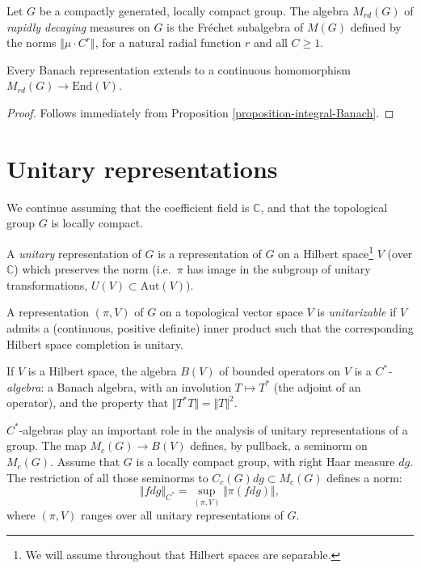 \begin{definition}
\label{definition-rapidly-decaying}
 Let $G$ be a compactly generated, locally compact group. The algebra $M_{rd}(G)$ of {\it rapidly decaying} measures on $G$ is the Fr\'echet subalgebra of $M(G)$ defined by the norms $\Vert \mu \cdot C^r\Vert$, for a natural radial function $r$ and all $C \ge 1$. 
\end{definition}

\begin{proposition}
\label{proposition-rapiddecay-Banach}
Every Banach representation extends to a continuous homomorphism $M_{rd}(G)\to \text{End}(V)$. 
\end{proposition}

\begin{proof}
 Follows immediately from Proposition \ref{proposition-integral-Banach}.
\end{proof}

\section{Unitary representations}
\label{section-unitary-representations}

We continue assuming that the coefficient field is $\mathbb C$, and that the topological group $G$ is locally compact.


\begin{definition}
\label{definition-unitary-representation}
A {\it unitary} representation of $G$ is a representation of $G$ on a Hilbert space\footnote{We will assume throughout that Hilbert spaces are separable.} $V$ (over $\mathbb C$) which preserves the norm (i.e.\ $\pi$ has image in the subgroup of unitary transformations, $U(V)\subset \text{Aut}(V)$). 

A representation $(\pi,V)$ of $G$ on a topological vector space $V$ is {\it unitarizable} if $V$ admits a (continuous, positive definite) inner product such that the corresponding Hilbert space completion is unitary.
\end{definition}

If $V$ is a Hilbert space, the algebra $B(V)$ of bounded operators on $V$ is a {\it $C^*$-algebra}: a Banach algebra, with an involution $T\mapsto T^*$ (the adjoint of an operator), and the property that $\Vert T^*T\Vert = \Vert T\Vert^2$.

$C^*$-algebras play an important role in the analysis of unitary representations of a group. 
The map $M_c(G)\to B(V)$ defines, by pullback, a seminorm on $M_c(G)$. Assume that $G$ is a locally compact group, with right Haar measure $dg$. The restriction of all those seminorms to $C_c(G)dg\subset M_c(G)$ defines a norm:
$$ \Vert fdg \Vert_{C^*} = \sup_{(\pi,V)} \Vert \pi(fdg)\Vert,$$
where $(\pi,V)$ ranges over all unitary representations of $G$. 

